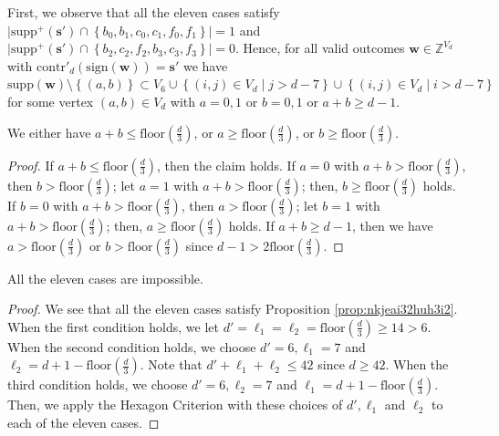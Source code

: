 First, we observe that all the eleven cases satisfy \( \lvert \mathrm{supp}^+(\mathbf{s}') \cap \left\{b_0, b_1, c_0, c_1, f_0, f_1 \right\} \rvert = 1 \) and \( \lvert \mathrm{supp}^+(\mathbf{s}') \cap \left\{b_2, c_2, f_2, b_3, c_3, f_3 \right\} \rvert = 0 \).
Hence, for all valid outcomes \( \mathbf{w} \in \mathbb{Z}^{V_d} \) with \( \mathrm{contr}'_d(\mathrm{sign}(\mathbf{w})) = \mathbf{s}' \) we have \( \mathrm{supp}(\mathbf{w}) \setminus \left\{ (a,b) \right\} \subset V_6 \cup \left\{ (i,j) \in V_d \mid j > d - 7 \right\}  \cup \left\{ (i,j) \in V_d \mid i > d - 7 \right\}  \)
for some vertex \( (a,b) \in V_d \) with \( a = 0,1 \) or \( b=0,1 \) or \( a + b \geq d-1 \).

\begin{proposition}\label{prop:nkjeai32huh3i2}
    We either have  \( a + b \leq \mathrm{floor}(\frac{d}{3}) \), or \( a \geq \mathrm{floor}(\frac{d}{3}) \), or \( b \geq \mathrm{floor}(\frac{d}{3}) \).
\end{proposition}

\begin{proof}
    If \( a + b \leq \mathrm{floor}(\frac{d}{3}) \), then the claim holds. If \( a = 0 \) with \( a + b > \mathrm{floor}(\frac{d}{3}) \), then \( b > \mathrm{floor}(\frac{d}{3}) \); let \( a = 1 \) with \( a + b > \mathrm{floor}(\frac{d}{3}) \); then, \( b \geq \mathrm{floor}(\frac{d}{3}) \) holds. If \( b = 0 \) with \( a + b > \mathrm{floor}(\frac{d}{3}) \), then \( a > \mathrm{floor}(\frac{d}{3}) \); let \( b = 1 \) with \( a + b > \mathrm{floor}(\frac{d}{3}) \); then, \( a \geq \mathrm{floor}(\frac{d}{3}) \) holds. If \( a + b \geq d-1  \), then we have \( a > \mathrm{floor}(\frac{d}{3}) \) or \( b > \mathrm{floor}(\frac{d}{3}) \) since \( d-1 > 2 \mathrm{floor}(\frac{d}{3}) \).
\end{proof}

\begin{proposition}
    All the eleven cases are impossible.
\end{proposition}

\begin{proof}
    We see that all the eleven cases satisfy Proposition \ref{prop:nkjeai32huh3i2}. When the first condition holds, we let \( d' = \ell_1 = \ell_2 = \mathrm{floor}(\frac{d}{3}) \geq 14 > 6 \). When the second condition holds, we choose \( d' = 6, \ell_1 = 7 \) and \( \ell_2 = d + 1 - \mathrm{floor}(\frac{d}{3}) \). Note that \( d' + \ell_1 + \ell_2 \leq 42 \) since \( d \geq 42 \). When the third condition holds, we choose  \( d' = 6, \ell_2 = 7 \) and \( \ell_1 = d + 1 - \mathrm{floor}(\frac{d}{3}) \). Then, we apply the Hexagon Criterion with these choices of \( d', \ell_1 \) and \( \ell_2 \) to each of the eleven cases.
\end{proof}


